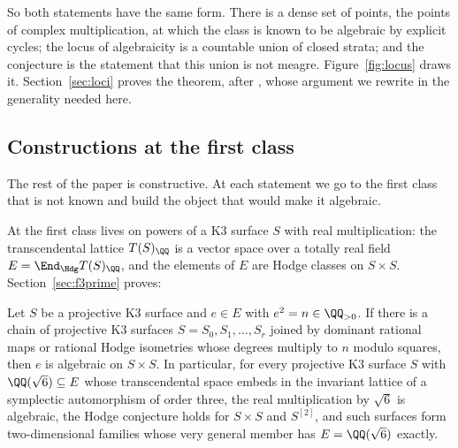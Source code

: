 So both statements have the same form. There is a dense set of points, the points of complex multiplication, at which the class is known to be algebraic by explicit cycles; the locus of algebraicity is a countable union of closed strata; and the conjecture is the statement that this union is not meagre. Figure~\ref{fig:locus} draws it. Section~\ref{sec:loci} proves the theorem, after \cite{BMB26}, whose argument we rewrite in the generality needed here.

\subsection{Constructions at the first class}

The rest of the paper is constructive. At each statement we go to the first class that is not known and build the object that would make it algebraic.

At \Fiii{} the first class lives on powers of a K3 surface $S$ with real multiplication: the transcendental lattice $T(S)_{\QQ}$ is a vector space over a totally real field $E=\End_{\Hdg}T(S)_{\QQ}$, and the elements of $E$ are Hodge classes on $S\times S$. Section~\ref{sec:f3prime} proves:

\begin{theorem}\label{thm:intro-chain}
Let $S$ be a projective K3 surface and $e\in E$ with $e^{2}=n\in\QQ_{>0}$. If there is a chain of projective K3 surfaces $S=S_{0},S_{1},\dots,S_{r}$ joined by dominant rational maps or rational Hodge isometries whose degrees multiply to $n$ modulo squares, then $e$ is algebraic on $S\times S$. In particular, for every projective K3 surface $S$ with $\QQ(\sqrt6)\subseteq E$ whose transcendental space embeds in the invariant lattice of a symplectic automorphism of order three, the real multiplication by $\sqrt6$ is algebraic, the Hodge conjecture holds for $S\times S$ and $S^{[2]}$, and such surfaces form two-dimensional families whose very general member has $E=\QQ(\sqrt6)$ exactly.
\end{theorem}

